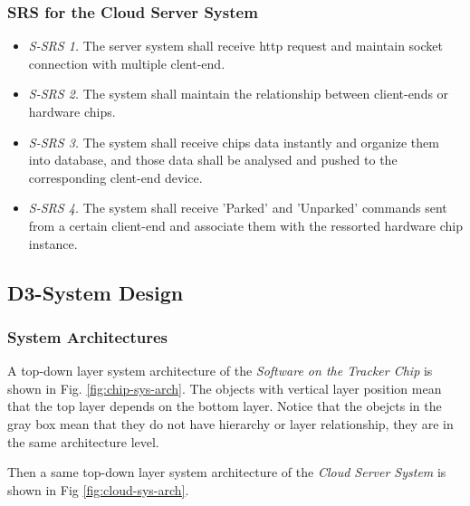 \documentclass[transmag, conference, onecolumn]{IEEEtran}
\begin{document}
\subsubsection*{\textbf{SRS for the Cloud Server System}}

\begin{itemize}
	\item \textit{S-SRS 1.} The server system shall receive http request
	      and maintain socket connection with multiple clent-end.

	\item \textit{S-SRS 2.} The system shall maintain the relationship between client-ends or hardware chips.

	\item \textit{S-SRS 3.} The system shall receive chips data instantly and organize them into database,
	      and those data shall be analysed and pushed to the corresponding clent-end device.

	\item \textit{S-SRS 4.} The system shall receive 'Parked' and 'Unparked' commands sent from a certain client-end
	      and associate them with the ressorted hardware chip instance.
\end{itemize}

\subsection*{\textbf{D3-System Design}}

\subsubsection*{\textbf{System Architectures}}

A top-down layer system architecture of the \textit{Software on the Tracker Chip} is shown in Fig. \ref{fig:chip-sys-arch}.
The objects with vertical layer position mean that the top layer depends on the bottom layer.
Notice that the obejcts in the gray box mean that they do not have hierarchy or layer relationship, they are in the same architecture level.


Then a same top-down layer system architecture of the \textit{Cloud Server System} is shown in Fig \ref{fig:cloud-sys-arch}.
\end{document}
